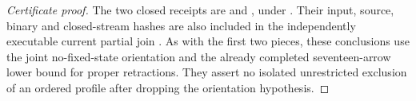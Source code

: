 \begin{proof}[Certificate proof]
The two closed receipts are
 and
, under
.
Their input, source, binary and closed-stream hashes are
also included in the independently executable current
partial join
.
As with the first two pieces, these conclusions use the
joint no-fixed-state orientation and the already completed
seventeen-arrow lower bound for proper retractions.
They assert no isolated unrestricted exclusion of an
ordered profile after dropping the orientation hypothesis.
\end{proof}
